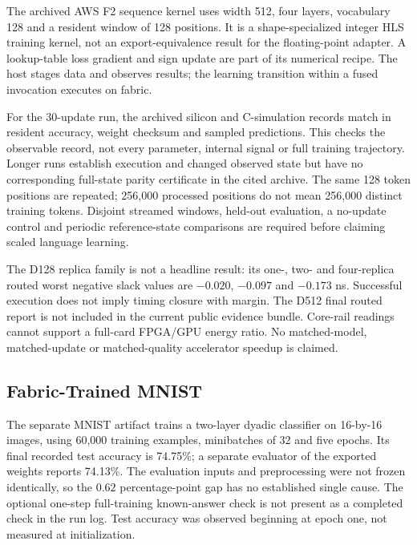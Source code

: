 The archived AWS F2 sequence kernel uses width 512, four layers, vocabulary
128 and a resident window of 128 positions. It is a shape-specialized
integer HLS training kernel, not an export-equivalence result for the
floating-point adapter. A lookup-table loss gradient and sign update are
part of its numerical recipe. The host stages data and observes results;
the learning transition within a fused invocation executes on fabric.

\begin{table}[h]
\centering
\caption{Historical D512 execution. All updates reuse one resident
128-position window. Throughput is the integer value reported in each raw
run; it is not an accelerator speedup or held-out learning metric.}
\small

\end{table}

For the 30-update run, the archived silicon and C-simulation records match
in resident accuracy, weight checksum and sampled predictions. This checks
the observable record, not every parameter, internal signal or full training
trajectory. Longer runs establish execution and changed observed state but
have no corresponding full-state parity certificate in the cited archive.
The same 128 token positions are repeated; 256,000 processed positions do
not mean 256,000 distinct training tokens. Disjoint streamed windows,
held-out evaluation, a no-update control and periodic reference-state
comparisons are required before claiming scaled language learning.

The D128 replica family is not a headline result: its one-, two- and
four-replica routed worst negative slack values are $-0.020$, $-0.097$ and
$-0.173$ ns. Successful execution does not imply timing closure with margin.
The D512 final routed report is not included in the current public evidence
bundle. Core-rail readings cannot support a full-card FPGA/GPU energy ratio.
No matched-model, matched-update or matched-quality accelerator speedup is
claimed.

\subsection{Fabric-Trained MNIST}

The separate MNIST artifact trains a two-layer dyadic classifier on 16-by-16
images, using 60,000 training examples, minibatches of 32 and five epochs.
Its final recorded test accuracy is 74.75\%; a separate evaluator of the
exported weights reports 74.13\%. The evaluation inputs and preprocessing
were not frozen identically, so the $0.62$ percentage-point gap has no
established single cause. The optional one-step full-training known-answer
check is not present as a completed check in the run log. Test accuracy was
observed beginning at epoch one, not measured at initialization.

